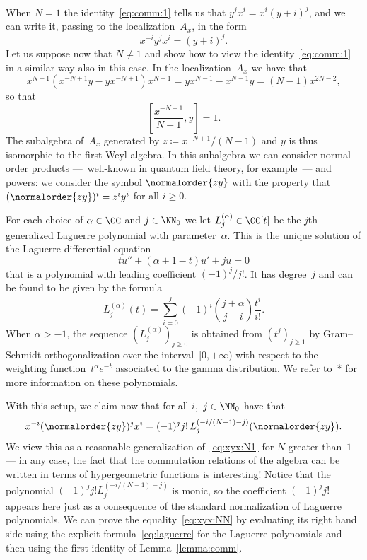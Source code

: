 \begin{Remark}\label{rem:laguerre}
When $N=1$ the identity~\eqref{eq:comm:1} tells us that
$y^jx^i=x^i(y+i)^j$, and we can write it, passing to the
localization~$A_x$, in the form
  \[ \label{eq:xyx:N1}
  x^{-i}y^jx^i = (y+i)^j.
  \]
Let us suppose now that $N\neq1$ and show how to view the
identity~\eqref{eq:comm:1} in a similar way also in this case. In the
localization~$A_x$ we have that
  \[
  x^{N-1}(x^{-N+1}y - y x^{-N+1})x^{N-1}
        = yx^{N-1} - x^{N-1}y
        = (N-1)x^{2N-2},
  \]
so that
  \[
  \left[ \frac{x^{-N+1}}{N-1}, y \right] = 1.
  \]
The subalgebra of~$A_x$ generated by $z\coloneqq x^{-N+1}/(N-1)$ and $y$ is
thus isomorphic to the first Weyl algebra. In this subalgebra we can
consider normal-order products ---~well-known in quantum field theory, for
example~--- and powers: we consider the symbol $\normalorder{zy}$ with the
property that $(\normalorder{zy})^i=z^iy^i$ for all $i\geq0$.

For each choice of $\alpha\in\CC$ and $j\in\NN_0$ we let
$L^{(\alpha)}_j\in\CC[t]$ be the $j$th generalized Laguerre polynomial with
parameter~$\alpha$. This is the unique solution of the Laguerre
differential equation
  \[
  tu'' + (\alpha+1-t)u' + ju = 0
  \]
that is a polynomial with leading coefficient $(-1)^j/j!$. It has
degree~$j$ and can be found to be given by the formula
  \[ \label{eq:laguerre}
  L^{(\alpha)}_j(t) = \sum_{i=0}^j(-1)^i\binom{j+\alpha}{j-i}
        \frac{t^i}{i!}.
  \]
When $\alpha>-1$, the sequence $(L^{(\alpha)}_j)_{j\geq0}$ is obtained from
$(t^j)_{j\geq1}$ by Gram--Schmidt orthogonalization over the
interval~$[0,+\infty)$ with respect to the weighting function~$t^\alpha
e^{-t}$ associated to the gamma distribution. We refer
to~\cite{AAR}*{} for more information on these
polynomials.

With this setup, we claim now that for all $i$,~$j\in\NN_0$ have that
  \[ \label{eq:xyx:NN}
  x^{-i}(\normalorder{zy})^j x^i
  = (-1)^j j! \, L^{(-i/(N-1)-j)}_j(\normalorder{zy}).
  \]
We view this as a reasonable generalization of~\eqref{eq:xyx:N1} for $N$
greater than~$1$ --- in any case, the fact that the commutation relations
of the algebra can be written in terms of hyper\-geometric functions is
interesting! Notice that the polynomial $(-1)^jj!L_j^{(-i/(N-1)-j)}$ is
monic, so the coefficient $(-1)^jj!$ appears here just as a
consequence of the standard normalization of Laguerre polynomials. We can
prove the equality~\eqref{eq:xyx:NN} by evaluating its right hand side using
the explicit formula~\eqref{eq:laguerre} for the Laguerre polynomials and
then using the first identity of Lemma~\ref{lemma:comm}. 
\end{Remark}

